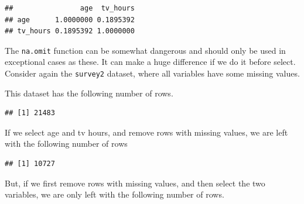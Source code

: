 \documentclass[]{tufte-book}
\newenvironment{Shaded}{}{}
\newcommand{\KeywordTok}[1]{\textcolor[rgb]{0.00,0.44,0.13}{\textbf{#1}}}
\newcommand{\StringTok}[1]{\textcolor[rgb]{0.25,0.44,0.63}{#1}}
\newcommand{\OperatorTok}[1]{\textcolor[rgb]{0.40,0.40,0.40}{#1}}
\newcommand{\NormalTok}[1]{#1}
\begin{document}
\begin{verbatim}
##                age  tv_hours
## age      1.0000000 0.1895392
## tv_hours 0.1895392 1.0000000
\end{verbatim}

The \texttt{na.omit} function can be somewhat dangerous and should only
be used in exceptional cases as these. It can make a huge difference if
we do it before select. Consider again the \texttt{survey2} dataset,
where all variables have some missing values.

This dataset has the following number of rows.

\begin{Shaded}
\end{Shaded}

\begin{verbatim}
## [1] 21483
\end{verbatim}

If we select age and tv hours, and remove rows with missing values, we
are left with the following number of rows

\begin{Shaded}
\end{Shaded}

\begin{verbatim}
## [1] 10727
\end{verbatim}

But, if we first remove rows with missing values, and then select the
two variables, we are only left with the following number of rows.

\begin{Shaded}
\end{Shaded}
\end{document}
